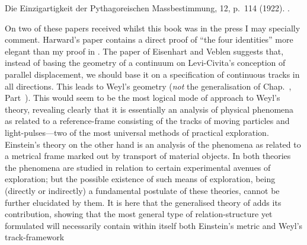 \documentclass[12pt]{book}
\begin{document}
\Bibitem{\Same} Die Einzigartigkeit der Pythagoreischen Massbestimmung,  12, p.~114
(1922). .
\medskip

On two of these papers received whilst this book was in the press I may specially
comment. Harward's paper contains a direct proof of ``the four identities'' more elegant
than my proof in . The paper of Eisenhart and Veblen suggests that, instead of basing
the geometry of a continuum on Levi\hyp{}Civita's conception of parallel displacement, we should
base it on a specification of continuous tracks in all directions. This leads to Weyl's geometry
(\emph{not} the generalisation of Chap.~, Part~). This would seem to be the most logical mode
of approach to Weyl's theory, revealing clearly that it is essentially an analysis of physical
phenomena as related to a reference\hyp{}frame consisting of the tracks of moving particles and
light\hyp{}pulses---two of the most universal methods of practical exploration. Einstein's theory
on the other hand is an analysis of the phenomena as related to a metrical frame marked
out by transport of material objects. In both theories the phenomena are studied in relation
to certain experimental avenues of exploration; but the possible existence of such means
of exploration, being (directly or indirectly) a fundamental postulate of these theories,
cannot be further elucidated by them. It is here that the generalised theory of  adds
its contribution, showing that the most general type of relation\hyp{}structure yet formulated
will necessarily contain within itself both Einstein's metric and Weyl's track\hyp{}framework

\printindex
\end{document}
